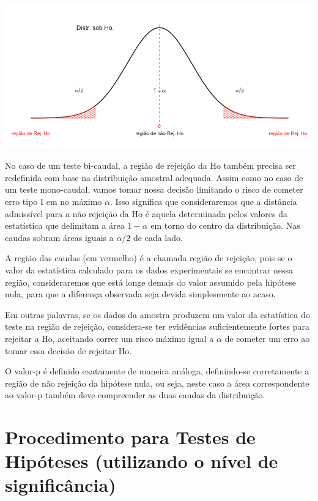 \documentclass[
]{book}
\theoremstyle{definition}
\theoremstyle{definition}
\theoremstyle{definition}
\theoremstyle{remark}
\begin{document}
\includegraphics[width=1\linewidth]{img/TH-regiao-rej-Ho}

No caso de um teste bi-caudal, a região de rejeição da Ho também precisa ser redefinida com base na distribuição amostral adequada. Assim como no caso de um teste mono-caudal, vamos tomar nossa decisão limitando o risco de cometer erro tipo I em no máximo \(\alpha\). Isso significa que consideraremos que a distância admissível para a não rejeição da Ho é aquela determinada pelos valores da estatística que delimitam a área \(1-\alpha\) em torno do centro da distribuição. Nas caudas sobram áreas iguais a \(\alpha/2\) de cada lado.

A região das caudas (em vermelho) é a chamada região de rejeição, pois se o valor da estatística calculado para os dados experimentais se encontrar nessa região, consideraremos que está longe demais do valor assumido pela hipótese nula, para que a diferença observada seja devida simplesmente ao acaso.

Em outras palavras, se os dados da amostra produzem um valor da estatística do teste na região de rejeição, considera-se ter evidências suficientemente fortes para rejeitar a Ho, aceitando correr um risco máximo igual a \(\alpha\) de cometer um erro ao tomar essa decisão de rejeitar Ho.

O valor-p é definido exatamente de maneira análoga, definindo-se corretamente a região de não rejeição da hipótese nula, ou seja, neste caso a área correspondente ao valor-p também deve compreender as duas caudas da distribuição.

\hypertarget{procedimento-para-testes-de-hipuxf3teses-utilizando-o-nuxedvel-de-significuxe2ncia}{%
\section{Procedimento para Testes de Hipóteses (utilizando o nível de significância)}\label{procedimento-para-testes-de-hipuxf3teses-utilizando-o-nuxedvel-de-significuxe2ncia}}
\end{document}
